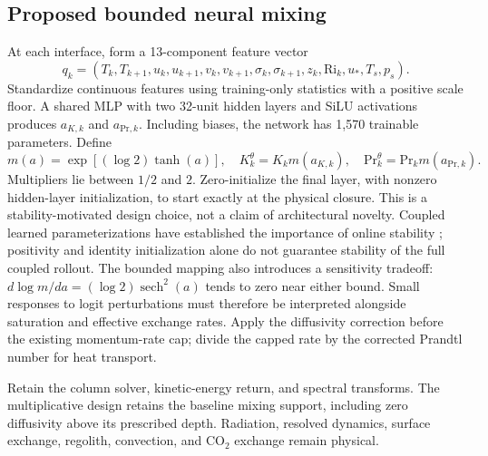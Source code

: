 \documentclass{article}
\begin{document}
\subsection{Proposed bounded neural mixing}
At each interface, form a 13-component feature vector
\begin{equation}
q_k=(T_k,T_{k+1},u_k,u_{k+1},v_k,v_{k+1},
\sigma_k,\sigma_{k+1},z_k,\mathrm{Ri}_k,u_*,T_s,p_s).
\end{equation}
Standardize continuous features using training-only statistics with a positive
scale floor. A shared MLP with two 32-unit hidden layers and SiLU activations
produces \(a_{K,k}\) and \(a_{\mathrm{Pr},k}\). Including biases, the network
has 1,570 trainable parameters. Define
\begin{equation}
m(a)=\exp[(\log2)\tanh(a)],\quad
K_k^\theta=K_km(a_{K,k}),\quad
\mathrm{Pr}_k^\theta=\mathrm{Pr}_km(a_{\mathrm{Pr},k}).
\label{eq:closure}
\end{equation}
Multipliers lie between \(1/2\) and \(2\). Zero-initialize the final layer,
with nonzero hidden-layer initialization, to start exactly at the physical
closure. This is a stability-motivated design choice, not a claim of architectural
novelty. Coupled learned parameterizations have established the importance of
online stability \citep{yuval2020stable}; positivity and identity initialization
alone do not guarantee stability of the full coupled rollout.
The bounded mapping also introduces a sensitivity tradeoff:
\(d\log m/da=(\log 2)\operatorname{sech}^2(a)\) tends to zero near
either bound. Small responses to logit perturbations must therefore be
interpreted alongside saturation and effective exchange rates.
Apply the diffusivity correction before the existing momentum-rate
cap; divide the capped rate by the corrected Prandtl number for heat transport.

Retain the column solver, kinetic-energy return, and spectral transforms.
The multiplicative design retains the baseline mixing support, including
zero diffusivity above its prescribed depth. Radiation, resolved dynamics,
surface exchange, regolith, convection, and CO$_2$ exchange remain physical.
\end{document}
